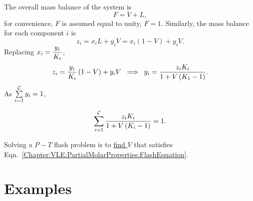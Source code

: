       The overall mass balance of the system is
         \begin{displaymath}
             F = V + L,
         \end{displaymath}
         for convenience, $F$ is assumed equal to unity, $F=1$. Similarly, the mass balance for each component $i$ is
         \begin{displaymath}
            z_{i} = x_{i}L + y_{i}V = x_{i}\left(1-V\right) + y_{i}V.
         \end{displaymath}
         Replacing $x_{i} = \frc{y_{i}}{K_{i}}$,
         \begin{displaymath}
           z_{i} = \frc{y_{i}}{K_{i}}\left(1-V\right) + y_{i}V \;\;\Longrightarrow \;\;y_{i} = \frc{z_{i}K_{i}}{1+V\left(K_{1}-1\right)}. 
         \end{displaymath}
         As $\summation[y_{i}]{i=1}{\mathcal{C}} = 1$,
         \begin{shaded}
           \begin{equation}
              \summation[\frc{z_{i}K_{i}}{1+V\left(K_{i}-1\right)}]{i=1}{\mathcal{C}} = 1.\label{Chapter:VLE:PartialMolarProperties:FlashEquation} 
           \end{equation}
         \end{shaded}
         Solving a $P-T$ flash problem is to \underline{find $V$} that satisfies Eqn.~\ref{Chapter:VLE:PartialMolarProperties:FlashEquation}.
      
\clearpage

\section{Examples}

